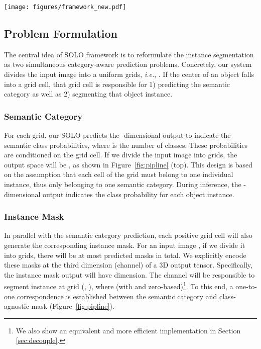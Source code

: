 \documentclass[runningheads]{llncs}
\def\method{{SOLO}\xspace}
\def\OurMethod{{SOLO}\xspace}
\begin{document}
\begin{figure*}[t]
\centering
    \texttt{[image: figures/framework\_new.pdf]}
\caption{\textbf{\OurMethod framework.}
    We reformulate the instance segmentation as two sub-tasks:
    category prediction and instance mask generation problems.
    An input image is divided into a uniform grids, \textit{i.e.}, .
    Here we illustrate the grid with .
    If the center of an object falls into a grid cell, that grid cell
    is responsible for predicting the semantic category (top)
    and masks of instances (bottom).
    We do not show the
    feature pyramid network (FPN) here for simpler
    illustration.
}
\label{fig:pipline}
\end{figure*}

\subsection{Problem Formulation}
The central idea of \OurMethod framework is to reformulate the instance segmentation as two simultaneous category-aware prediction
problems. Concretely, our system divides the input image into a uniform grids, \textit{i.e.}, . If the center of an object falls into a grid cell, that grid cell
is responsible for 1) predicting the semantic category as well as 2) segmenting that object instance.




\subsubsection{Semantic Category}
For each grid, our \method predicts the -dimensional output to indicate the semantic class probabilities,  where  is the number of classes. These probabilities are conditioned on the grid cell. If we divide the input image into  grids, the output space will be  , as shown in Figure~\ref{fig:pipline} (top). This design is based on the assumption that each cell of the  grid must belong to one individual instance, thus only belonging to one semantic category. During inference, the -dimensional output indicates the class probability for each object instance.




\subsubsection{Instance Mask}
In parallel with the semantic category prediction, each positive grid cell will also generate the corresponding instance mask. For an input image , if we divide it into  grids, there will be at most  predicted masks in total. We explicitly encode these masks at the third dimension (channel) of a
3D
 output  tensor. Specifically, the instance mask output will have  dimension. The  channel will be responsible to segment instance at grid (, ), where  (with  and  zero-based)\footnote{We also show an equivalent and more efficient implementation in Section \ref{sec:decouple}.}. To this end,  a one-to-one correspondence is established between the semantic category and class-agnostic mask (Figure~\ref{fig:pipline}).
\end{document}
